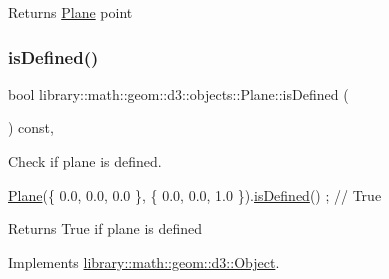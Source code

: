 \begin{DoxyReturn}{Returns}
\hyperlink{classlibrary_1_1math_1_1geom_1_1d3_1_1objects_1_1_plane}{Plane} point 
\end{DoxyReturn}
\mbox{\label{classlibrary_1_1math_1_1geom_1_1d3_1_1objects_1_1_plane_aafbc8274c270be143b2fa3dc46459f17}} 
\subsubsection{\texorpdfstring{is\+Defined()}{isDefined()}}
{\footnotesize\ttfamily bool library\+::math\+::geom\+::d3\+::objects\+::\+Plane\+::is\+Defined (\begin{DoxyParamCaption}{ }\end{DoxyParamCaption}) const\hspace{0.3cm}{\ttfamily [override]}, {\ttfamily [virtual]}}



Check if plane is defined. 


\begin{DoxyCode}
\hyperlink{classlibrary_1_1math_1_1geom_1_1d3_1_1objects_1_1_plane_a81fe78a983e2cb6ee6ad9bfabd22c3a4}{Plane}(\{ 0.0, 0.0, 0.0 \}, \{ 0.0, 0.0, 1.0 \}).\hyperlink{classlibrary_1_1math_1_1geom_1_1d3_1_1objects_1_1_plane_aafbc8274c270be143b2fa3dc46459f17}{isDefined}() ; \textcolor{comment}{// True}
\end{DoxyCode}


\begin{DoxyReturn}{Returns}
True if plane is defined 
\end{DoxyReturn}


Implements \hyperlink{classlibrary_1_1math_1_1geom_1_1d3_1_1_object_a2216442e322f0c3ca5f01a4efa22baf7}{library\+::math\+::geom\+::d3\+::\+Object}.

\mbox{\label{classlibrary_1_1math_1_1geom_1_1d3_1_1objects_1_1_plane_a5dfafb90b0da2cc239092ea6c655ec2a}} 
